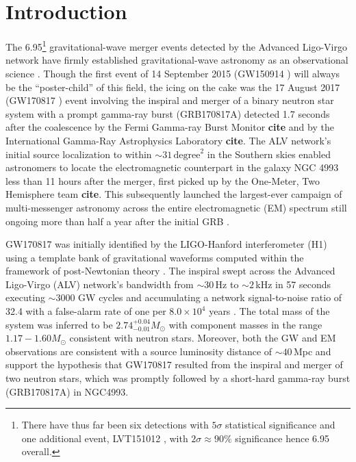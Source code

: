 \documentclass[amsmath,amssymb,aps,floats,amsfonts,notitlepage,superscriptaddress,eqsecnum,nofootinbib,10pt]{revtex4-1}
\begin{document}
\section{Introduction}\label{Sec:Intro}
The 6.95\footnote{There have thus far been six detections with $5\sigma$ statistical significance and one additional event, LVT151012 \cite{TheLIGOScientific:2016pea}, with $2\sigma \approx 90\%$ significance hence 6.95 overall.} 
gravitational-wave merger events detected by the Advanced Ligo-Virgo network have firmly established gravitational-wave astronomy
as an observational science \cite{TheLIGOScientific:2016pea, Abbott:2017gyy, Abbott:2017oio, Abbott:2017vtc, GW170817}. 
Though the first event of 14 September 2015 (GW150914 \cite{GW150914}) will always be the ``poster-child'' of this field,
the icing on the cake was the 17 August 2017 (GW170817 \cite{GW170817}) event involving the inspiral and merger of a binary neutron star system with a prompt gamma-ray burst (GRB170817A) detected 1.7 seconds after the coalescence by the Fermi Gamma-ray Burst Monitor {\bf cite} and by the International Gamma-Ray Astrophysics Laboratory {\bf cite}. 
The ALV network's initial source localization to within $\sim 31\,\text{degree}^2$ in the Southern skies
enabled astronomers to locate the electromagnetic counterpart in the galaxy NGC 4993 less than 11 hours after the merger, 
first picked up by the One-Meter, Two Hemisphere team {\bf cite}.
This subsequently launched the largest-ever campaign of multi-messenger astronomy across the entire electromagnetic (EM) spectrum still ongoing
more than half a year after the initial GRB \cite{GBM:2017lvd}. 

GW170817 was initially identified by the LIGO-Hanford interferometer (H1) 
using a template bank of gravitational waveforms computed within the framework of post-Newtonian theory \cite{Buonanno:2009zt, Blanchet_LRR}.
The inspiral swept across the Advanced Ligo-Virgo (ALV) network's bandwidth from $\sim 30\,$Hz to $\sim 2\,$kHz in 57 seconds
executing $\sim 3000$ GW cycles and accumulating a network signal-to-noise ratio of 32.4 with a false-alarm rate of one per $8.0\times 10^4$ years \cite{GW170817}. 
The total mass of the system was inferred to be $2.74^{+0.04}_{-0.01} M_\odot$ with component masses in the range $1.17-1.60 M_\odot$ consistent
with neutron stars.
Moreover, both the GW and EM observations are consistent with a source luminosity distance of $\sim 40\,$Mpc
and support the hypothesis that GW170817 resulted from the inspiral and merger of two neutron stars, 
which was promptly followed by a short-hard gamma-ray burst (GRB170817A) in NGC4993. 
\end{document}
